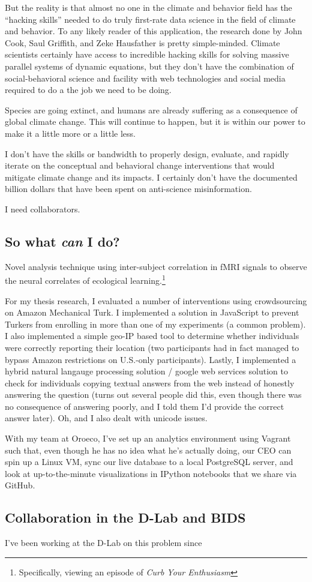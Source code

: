 \documentclass[12pt]{article}
\begin{document}
But the reality is that almost no one in the climate and behavior field has the
“hacking skills” needed to do truly first-rate data science in the field of
climate and behavior. To any likely reader of this application, the research
done by John Cook, Saul Griffith, and Zeke Hausfather is pretty simple-minded.
Climate scientists certainly have access to incredible hacking skills for
solving massive parallel systems of dynamic equations, but they don't
have the combination of social-behavioral science and facility with
web technologies and social media required to do a the job we need to be doing.

Species are going extinct, %
and humans are already suffering as a consequence of global climate change. %
This will continue to happen, but it is within our power to make it a little
more or a little less.

I don't have the skills or bandwidth to properly design, evaluate, and rapidly
iterate on the conceptual and behavioral change interventions that would
mitigate climate change and its impacts. I certainly don't have the documented
billion dollars that have been spent on anti-science misinformation. 

I need collaborators. 

\subsection*{So what \emph{can} I do?}

Novel analysis technique using inter-subject correlation in fMRI signals to
observe the neural correlates of ecological learning.\footnote{Specifically,
    viewing an episode of \emph{Curb Your Enthusiasm}}

For my thesis research, I evaluated a number of interventions using
crowdsourcing on Amazon Mechanical Turk. I implemented a solution in JavaScript
to prevent Turkers from enrolling in more than one of my experiments (a common
problem). %
I also implemented a simple geo-IP based tool to determine whether individuals were
correctly reporting their location (two participants had in fact managed to
bypass Amazon restrictions on U.S.-only participants). Lastly, I implemented a
hybrid natural langauge processing solution / google web services solution to
check for individuals copying textual answers from the web instead of honestly
answering the question (turns out several people did this, even though there was
no consequence of answering poorly, and I told them I'd provide the correct
answer later).
Oh, and I also dealt with unicode issues.

With my team at Oroeco, I've set up an analytics environment using Vagrant such
that, even though he has no idea what he's actually doing, our CEO can spin up a
Linux VM, sync our live database to a local PostgreSQL server, and look at
up-to-the-minute visualizations in IPython notebooks that we share via GitHub.

\subsection*{Collaboration in the D-Lab and BIDS}

I've been working at the D-Lab on this problem since 
\end{document}
